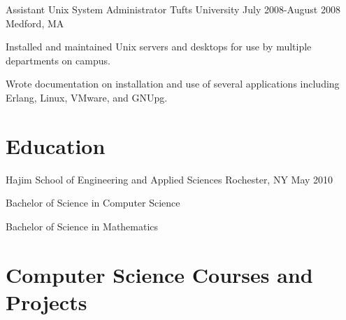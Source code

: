 \documentclass[letterpaper]{resume}
\begin{document}
\affiliation
{Assistant Unix System Administrator}
{Tufts University}
{July 2008-August 2008}
{Medford, MA}

\begin{compactitem}
	\item Installed and maintained Unix servers and desktops for use by multiple departments on campus. \par
	\item Wrote documentation on installation and use of several applications including Erlang, Linux, VMware, and GNUpg. \par
\end{compactitem}

\section{Education}

            {Hajim School of Engineering and Applied Sciences}
            {Rochester, NY}
            {May 2010}

\begin{compactitem}
	\item Bachelor of Science in Computer Science \par
	\item Bachelor of Science in Mathematics \par
\end{compactitem}

\section{Computer Science Courses and Projects}
\vspace{\secskip}
\end{document}
